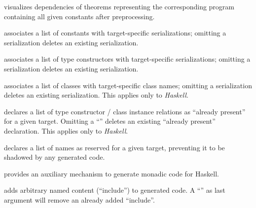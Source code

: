 \begin{isabellebody}
\begin{isamarkuptext}
\begin{description}
  \item \hyperlink{command.HOL.code-deps}{\mbox{}} visualizes dependencies of
  theorems representing the corresponding program containing all given
  constants after preprocessing.

  \item \hyperlink{command.HOL.code-const}{\mbox{}} associates a list of constants
  with target-specific serializations; omitting a serialization
  deletes an existing serialization.

  \item \hyperlink{command.HOL.code-type}{\mbox{}} associates a list of type
  constructors with target-specific serializations; omitting a
  serialization deletes an existing serialization.

  \item \hyperlink{command.HOL.code-class}{\mbox{}} associates a list of classes
  with target-specific class names; omitting a serialization deletes
  an existing serialization.  This applies only to \emph{Haskell}.

  \item \hyperlink{command.HOL.code-instance}{\mbox{}} declares a list of type
  constructor / class instance relations as ``already present'' for a
  given target.  Omitting a ``'' deletes an existing
  ``already present'' declaration.  This applies only to
  \emph{Haskell}.

  \item \hyperlink{command.HOL.code-reserved}{\mbox{}} declares a list of names as
  reserved for a given target, preventing it to be shadowed by any
  generated code.

  \item \hyperlink{command.HOL.code-monad}{\mbox{}} provides an auxiliary mechanism
  to generate monadic code for Haskell.

  \item \hyperlink{command.HOL.code-include}{\mbox{}} adds arbitrary named content
  (``include'') to generated code.  A ``'' as last argument
  will remove an already added ``include''.


\end{description}
\end{isamarkuptext}
\end{isabellebody}

